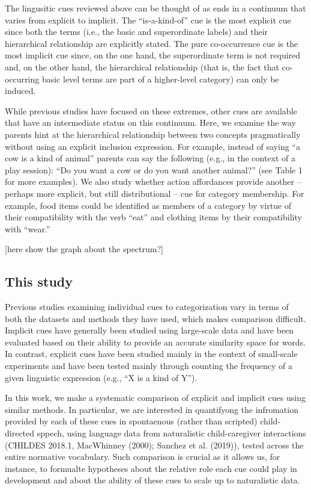 \documentclass[english,,man,floatsintext]{apa6}
\begin{document}
The lingusitic cues reviewed above can be thought of as ends in a continuum that varies from explicit to implicit. The \enquote{is-a-kind-of} cue is the most explicit cue since both the terms (i.e., the basic and superordinate labels) and their hierarchical relationship are explicitly stated. The pure co-occurrence cue is the most implicit cue since, on the one hand,
the superordinate term is not required and, on the other hand, the hierarchical relationship (that is, the fact that co-occurring basic level terms are part of a higher-level category) can only be induced.

While previous studies have focused on these extremes, other cues are available that have an intermediate status on this continuum. Here, we examine the way parents hint at the hierarchical relationship between two concepts pragmatically without using an explicit inclusion expression. For example, instead of saying \enquote{a cow is a kind of animal} parents can say the following (e.g., in the context of a play session): \enquote{Do you want a cow or do you want another animal?} (see Table 1 for more examples). We also study whether action affordances provide another -- perhaps more explicit, but still distributional -- cue for category membership. For example, food items could be identified as members of a category by virtue of their compatibility with the verb \enquote{eat} and clothing items by their compatibility with \enquote{wear.}

{[}here show the graph about the spectrum?{]}

\hypertarget{this-study}{%
\subsection{This study}\label{this-study}}

Previous studies examining individual cues to categorization vary in terms of both the datasets and methods they have used, which makes comparison difficult. Implicit cues have
generally been studied using large-scale data and have been evaluated based on their ability to provide an accurate similarity space for words. In contrast, explicit cues have been studied mainly in the context of small-scale experiments and have been tested mainly through counting the frequency of a given linguistic expression (e.g., \enquote{X is a kind of Y}).

In this work, we make a systematic comparison of explicit and implicit cues using similar methods. In particular, we are interested in quantifyong the infromation provided by each of these cues in spontaenous (rather than scripted) child-directed sppech, using language data from naturalistic child-caregiver interactions (CHILDES 2018.1, MacWhinney (2000); Sanchez et al. (2019)), tested across the entire normative vocabulary. Such comparison is crucial as it allows us, for instance, to formualte hypotheses about the relative role each cue could play in development and about the ability of these cues to scale up to naturalistic data.
\end{document}
